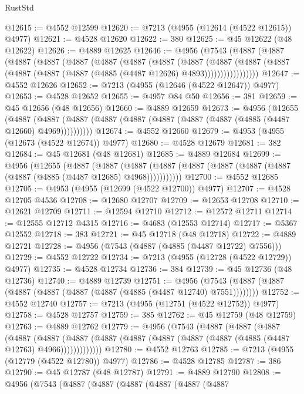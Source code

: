 \begin{lexlean}{RustStd}
\begin{coremodule}
@12615 := @4552 @12599
@12620 := @7213 (@4955 (@12614 (@4522 @12615)) @4977)
@12621 := @4528 @12620
@12622 := 380
@12625 := @45 @12622 (@48 @12622)
@12626 := @4889 @12625
@12646 := @4956
    (@7543
      (@4887
        (@4887
          (@4887
            (@4887
              (@4887
                (@4887
                  (@4887
                    (@4887
                      (@4887
                        (@4887
                          (@4887
                            (@4887 (@4887 (@4887 (@4887 (@4885 (@4487 @12626) @4893)))))))))))))))))
@12647 := @4552 @12626
@12652 := @7213 (@4955 (@12646 (@4522 @12647)) @4977)
@12653 := @4528 @12652
@12655 := @4957 @84 @50
@12656 := 381
@12659 := @45 @12656 (@48 @12656)
@12660 := @4889 @12659
@12673 := @4956
    (@12655
      (@4887 (@4887 (@4887 (@4887 (@4887 (@4887 (@4887 (@4887 (@4885 (@4487 @12660) @4969))))))))))
@12674 := @4552 @12660
@12679 := @4953 (@4955 (@12673 (@4522 @12674)) @4977)
@12680 := @4528 @12679
@12681 := 382
@12684 := @45 @12681 (@48 @12681)
@12685 := @4889 @12684
@12699 := @4956
    (@12655
      (@4887
        (@4887
          (@4887 (@4887 (@4887 (@4887 (@4887 (@4887 (@4887 (@4885 (@4487 @12685) @4968)))))))))))
@12700 := @4552 @12685
@12705 := @4953 (@4955 (@12699 (@4522 @12700)) @4977)
@12707 := @4528 @12705 @4536
@12708 := @12680 @12707
@12709 := @12653 @12708
@12710 := @12621 @12709
@12711 := @12594 @12710
@12712 := @12572 @12711
@12714 := @12555 @12712 @4315
@12716 := @4683 (@12553 @12714)
@12717 := @5367 @12552
@12718 := 383
@12721 := @45 @12718 (@48 @12718)
@12722 := @4889 @12721
@12728 := @4956 (@7543 (@4887 (@4885 (@4487 @12722) @7556)))
@12729 := @4552 @12722
@12734 := @7213 (@4955 (@12728 (@4522 @12729)) @4977)
@12735 := @4528 @12734
@12736 := 384
@12739 := @45 @12736 (@48 @12736)
@12740 := @4889 @12739
@12751 := @4956 (@7543 (@4887 (@4887 (@4887 (@4887 (@4887 (@4887 (@4885 (@4487 @12740) @7551))))))))
@12752 := @4552 @12740
@12757 := @7213 (@4955 (@12751 (@4522 @12752)) @4977)
@12758 := @4528 @12757
@12759 := 385
@12762 := @45 @12759 (@48 @12759)
@12763 := @4889 @12762
@12779 := @4956
    (@7543
      (@4887
        (@4887
          (@4887
            (@4887
              (@4887
                (@4887 (@4887 (@4887 (@4887 (@4887 (@4887 (@4885 (@4487 @12763) @4966)))))))))))))
@12780 := @4552 @12763
@12785 := @7213 (@4955 (@12779 (@4522 @12780)) @4977)
@12786 := @4528 @12785
@12787 := 386
@12790 := @45 @12787 (@48 @12787)
@12791 := @4889 @12790
@12808 := @4956
    (@7543
      (@4887
        (@4887
          (@4887
            (@4887
              (@4887
                (@4887

\end{coremodule}
\end{lexlean}
